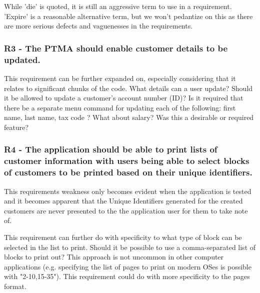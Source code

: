 While 'die' is quoted, it is still an aggressive term to use in a requirement. 'Expire' is a reasonable alternative term, but we won't pedantize on this as there are more serious defects and vaguenesses in the requirements.

\subsubsection{R3 - The PTMA should enable customer details to be updated.}

This requirement can be further expanded on, especially considering that it relates to significant chunks of the code. 
What details can a user update? Should it be allowed to update a customer's account number (ID)?
Is it required that there be a separate menu command for updating each of the following: first name, last name, tax code ? What about salary? Was this a desirable or required feature?    


\subsubsection{R4 - The application should be able to print lists of customer information with users being able to select blocks of customers to be printed based on their unique identifiers.}

This requirements weakness only becomes evident when the application is tested and it becomes apparent that the Unique Identifiers generated for the created customers are never presented to the the application user for them to take note of. 

This requirement can further do with specificity to what type of block can be selected in the list to print. 
Should it be possible to use a comma-separated list of blocks to print out? This approach is not uncommon in other computer applications (e.g. specifying the list of pages to print on modern OSes is possible with "2-10,15-35"). This requirement could do with more specificity to the pages format. 

